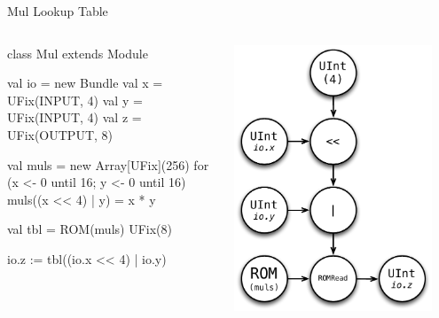 \documentclass[xcolor=pdflatex,dvipsnames,table]{beamer}
\begin{document}
\begin{frame}[fragile]{Mul Lookup Table}
\begin{columns}

\begin{scala}
class Mul extends Module {
  val io = new Bundle {
    val x   = UFix(INPUT, 4)
    val y   = UFix(INPUT, 4)
    val z   = UFix(OUTPUT, 8) }

  val muls = new Array[UFix](256)
  for (x <- 0 until 16; y <- 0 until 16) 
    muls((x << 4) | y) = x * y

  val tbl = ROM(muls){ UFix(8) }

  io.z := tbl((io.x << 4) | io.y)
}
\end{scala}


\begin{center}
\includegraphics[width=0.9\textwidth]{figs/muls.pdf} 
\end{center}

\end{columns}
\end{frame}
\end{document}
